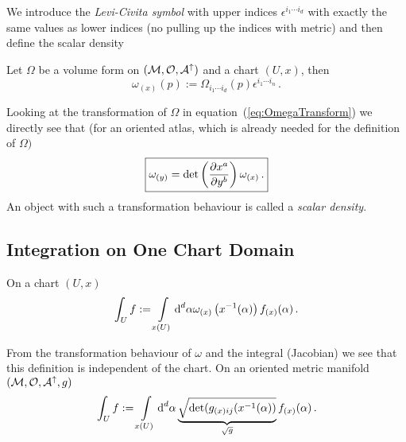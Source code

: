             We introduce the \textit{Levi-Civita symbol} with upper indices $\epsilon^{i_1\cdots i_d}$ with
            exactly the same values as lower indices (no pulling up the indices with metric)
            and then define the scalar density
            \begin{defn}[$\omega_{(y)}$]
                Let $\Omega$ be a volume form on $(\mathcal{M},\mathcal{O}, \mathcal{A}^\uparrow)$
                and a chart $(U,x)$, then
                \begin{equation}
                    \omega_{(x)}(p) := \Omega_{i_1\cdots i_d}(p)\epsilon^{i_1\cdots i_n}\,.
                \end{equation}
            \end{defn}
            Looking at the transformation of $\Omega$ in equation~(\ref{eq:OmegaTransform})
            we directly see that (for an oriented atlas, which is already needed for the definition
            of $\Omega)$
            \begin{equation}
                \boxed{%
                    \omega_{(y)} = \det\left( \frac{\partial x^a}{\partial y^b} \right) \omega_{(x)}\,.
                }
            \end{equation}
            An object with such a transformation behaviour is called a \textit{scalar density}.

            \subsection{Integration on One Chart Domain}

            \begin{defn}
                On a chart $(U,x)$
                \begin{equation}
                    \int_U f := \int\limits_{x(U)} \operatorname{d}^d\!\alpha \omega_{(x)}\left( x^{-1}(\alpha) \right) f_{(x)}(\alpha)\,.
                \end{equation}
            \end{defn}
            From the transformation behaviour of $\omega$ and the integral (Jacobian) we see that this definition is
            independent of the chart.
            On an oriented metric manifold $(\mathcal{M}, \mathcal{O}, \mathcal{A}^\uparrow, g)$
            \begin{equation}
                \int_U f:= \int\limits_{x(U)} \operatorname{d}^d\!\alpha \underbrace{\sqrt{\det(g_{(x)ij}(x^{-1}(\alpha))}}_{\sqrt{g}} f_{(x)}(\alpha)\,.
                \end{equation}

